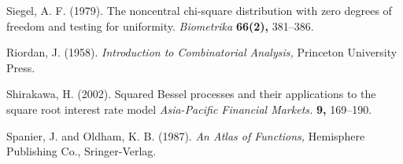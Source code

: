 \documentclass[6pt]{article}
\numberwithin{equation}{section}
\begin{document}
\begin{thebibliography}{99}
{\sc Siegel, A. F.} (1979).  The noncentral chi-square distribution with zero degrees of freedom and testing for uniformity. {\em Biometrika}
{\bf 66(2),} 381--386.

{\sc Riordan, J.} (1958).  \emph{Introduction to Combinatorial Analysis,} Princeton University Press.

{\sc Shirakawa, H.} (2002).  Squared Bessel processes and their applications
to the square root interest rate model {\em Asia-Pacific Financial Markets.}
{\bf 9,} 169--190.

{\sc Spanier, J. and Oldham, K. B.} (1987).  \emph{An Atlas of Functions,} Hemisphere Publishing Co., Sringer-Verlag.

\end{thebibliography}
\end{document}
